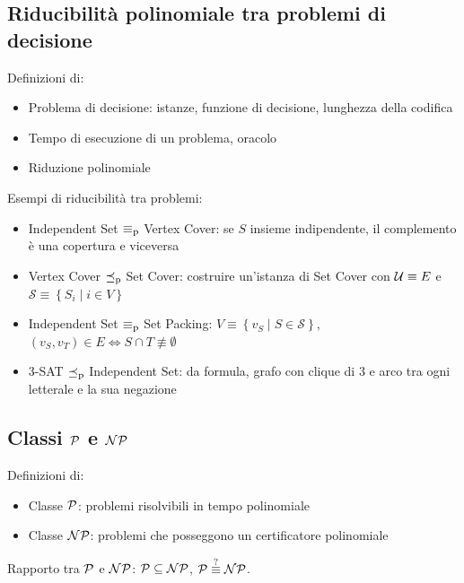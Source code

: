 
\subsection{Riducibilità polinomiale tra problemi di decisione}

Definizioni di:
\begin{itemize}
	\item Problema di decisione: istanze, funzione di decisione, lunghezza della codifica

	\item Tempo di esecuzione di un problema, oracolo

	\item Riduzione polinomiale
\end{itemize}

Esempi di riducibilità tra problemi:
\begin{itemize}
	\item Independent Set $\equivpol$ Vertex Cover: se $S$ insieme indipendente, il complemento è una copertura e viceversa

	\item Vertex Cover $\polred$ Set Cover: costruire un'istanza di Set Cover con $\U \equiv E$ e $\mathcal{S} \equiv \left\{S_i \mid i \in V \right\}$

	\item Independent Set $\equivpol$ Set Packing: $V \equiv \left\{v_S \mid S \in \mathcal{S} \right\}$, $(v_S, v_T) \in E \Leftrightarrow S \cap T \not \equiv \emptyset$

	\item 3-SAT $\polred$ Independent Set: da formula, grafo con clique di 3 e arco tra ogni letterale e la sua negazione
\end{itemize}

\subsection{Classi $\P$ e $\NP$}

Definizioni di:
\begin{itemize}
	\item Classe $\P$: problemi risolvibili in tempo polinomiale

	\item Classe $\NP$: problemi che posseggono un certificatore polinomiale
\end{itemize}

Rapporto tra $\P$ e $\NP$: $\P \subseteq \NP$, $\P \stackrel{?}{\equiv} \NP$.

